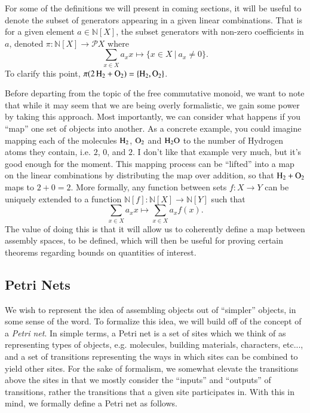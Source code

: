 \documentclass[aps,prd,onecolumn,nofootinbib,letterpaper,preprintnumbers,superscriptaddress,eqsecnum]{revtex4}
\theoremstyle{definition}
\newcommand{\N}{\mathbb{N}}
\newcommand{\powerset}{\mathcal{P}}
\newcommand{\red}[1]{{\color{red}#1}}
\begin{document}
For some of the definitions we will present in coming sections, it will be useful to denote the subset of generators appearing in a given linear combinations. That is for a given element $a \in \N[X]$, the subset generators with non-zero coefficients in $a$, denoted $\pi : \N[X] \rightarrow \powerset{X}$ where 
\begin{equation*}
    \displaystyle \sum_{x \in X} a_x x \mapsto \{ x \in X ~|~ a_x \ne 0 \}.
\end{equation*}
To clarify this point, $\pi(\ce{2H2} + \ce{O_2}) = \{\ce{H_2}, \ce{O_2}\}$.

Before departing from the topic of the free commutative monoid, we want to note that while it may seem that we are being overly formalistic, we gain some power by taking this approach.
Most importantly, we can consider what happens if you ``map'' one set of objects into another. 
As a concrete example, you could imagine mapping each of the molecules $\ce{H_2}$, $\ce{O_2}$ and $\ce{H_2O}$ to the number of Hydrogen atoms they contain, i.e. $2$, $0$, and $2$.
\red{I don't like that example very much, but it's good enough for the moment.}
This mapping process can be ``lifted'' into a map on the linear combinations by distributing the map over addition, so that $\ce{H_2} + \ce{O_2}$ maps to $2 + 0 = 2$. More formally, any function between sets $f : X \rightarrow Y$ can be uniquely extended to a function $\N[f] : \N[X] \rightarrow \N[Y]$ such that
\begin{equation*}
    \sum_{x \in X} a_x x \mapsto \sum_{x \in X} a_x f(x).
\end{equation*}
The value of doing this is that it will allow us to coherently define a map between assembly spaces, to be defined, which will then be useful for proving certain theorems regarding bounds on quantities of interest.

\subsection{Petri Nets}

We wish to represent the idea of assembling objects out of ``simpler'' objects, in some sense of the word.
To formalize this idea, we will build off of the concept of a \textit{Petri net}.
In simple terms, a Petri net is a set of sites which we think of as representing types of objects, e.g. molecules, building materials, characters, etc..., and a set of transitions representing the ways in which sites can be combined to yield other sites.
For the sake of formalism, we somewhat elevate the transitions above the sites in that we mostly consider the ``inputs'' and ``outputs'' of transitions, rather the transitions that a given site participates in.
With this in mind, we formally define a Petri net as follows.
\end{document}
